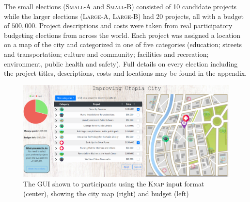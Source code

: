 \documentclass[runningheads]{llncs}
\newcommand{\kibitz}[2]{\ifnum\Comments=1{\color{#1}{#2}}\fi}
\newcommand{\gb}[1]{\kibitz{brown}{[GB:#1]}}
\newcommand{\knap}{\textsc{Knap}}
\begin{document}
The small elections (\textsc{Small-A} and  \textsc{Small-B}) consisted of 10 candidate projects while the larger elections  (\textsc{Large-A},  \textsc{Large-B}) had 20 projects, all with a budget of $500,000$.
Project descriptions and costs were taken from real participatory budgeting elections from across the world. \gb{I removed the footnote - doesn't make sense to just giev 1. }  %
Each project was assigned a location on a map of the  city  and categorized in one of five  categories   (education; streets and transportation; culture and community; facilities and recreation; environment, public health and safety). 
Full  details  on every election including the project titles, descriptions,  costs and locations may be found in the appendix.

 \begin{figure}[h]
\begin{center}
\includegraphics[clip, trim=0 3mm 0 0, width=13cm]{experiment/full system.PNG}
\caption{The GUI shown to participants using the \knap{}  input format (center), showing  the city map (right) and budget (left)
}\label{fig:interface}
\end{center}
\end{figure}

\end{document}
